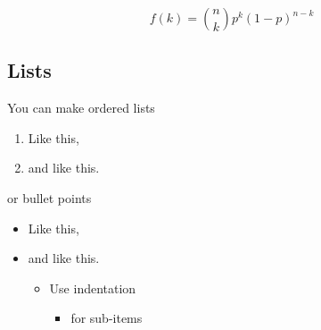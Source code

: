 \documentclass[9pt,a4paper,]{extarticle}
\begin{document}
\begin{equation}
  f\left(k\right) = \binom{n}{k} p^k\left(1-p\right)^{n-k}
  \label{eq:binom}
\end{equation}

\subsection{Lists}\label{lists}

You can make ordered lists

\begin{enumerate}
\def\labelenumi{\arabic{enumi}.}
\item
  Like this,
\item
  and like this.
\end{enumerate}

or bullet points

\begin{itemize}
\item
  Like this,
\item
  and like this.

  \begin{itemize}
  \item
    Use indentation

    \begin{itemize}
    \item
      for sub-items
    \end{itemize}
  \end{itemize}
\end{itemize}

{\small}
\end{document}
